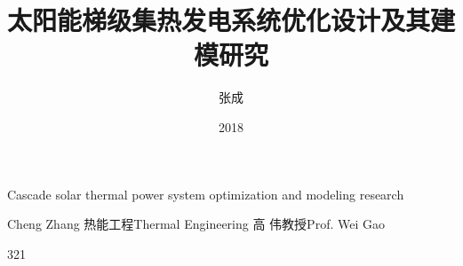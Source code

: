 \makenomenclature

\title{太阳能梯级集热发电系统优化设计及其建模研究}{Cascade solar thermal power system optimization and modeling research}
\author
{张成}{Cheng Zhang}
\major
{热能工程}{Thermal Engineering}
\supervisor
{高  伟\hspace{0.2em}教授}{Prof. Wei Gao}
\date{2018}{3}{21}